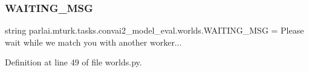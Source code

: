 \subsubsection{\texorpdfstring{W\+A\+I\+T\+I\+N\+G\+\_\+\+M\+SG}{WAITING\_MSG}}
{\footnotesize\ttfamily string parlai.\+mturk.\+tasks.\+convai2\+\_\+model\+\_\+eval.\+worlds.\+W\+A\+I\+T\+I\+N\+G\+\_\+\+M\+SG = \textquotesingle{}Please wait while we match you with another worker...\textquotesingle{}}



Definition at line 49 of file worlds.\+py.

